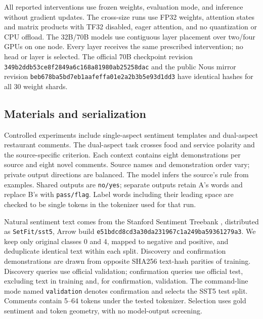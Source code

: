 \documentclass[11pt]{article}
\begin{document}
All reported interventions use frozen weights, evaluation mode, and inference without gradient updates. The cross-size runs use FP32 weights, attention states and matrix products with TF32 disabled, eager attention, and no quantization or CPU offload. The 32B/70B models use contiguous layer placement over two/four GPUs on one node. Every layer receives the same prescribed intervention; no head or layer is selected. The official 70B checkpoint revision \texttt{349b2ddb\allowbreak{}53ce8f28\allowbreak{}49a6c168\allowbreak{}a81980ab\allowbreak{}25258dac} and the public Nous mirror revision \texttt{beb678ba\allowbreak{}5bd7eb1a\allowbreak{}afeffa01\allowbreak{}e2a2b3b5\allowbreak{}e93d1dd3} have identical hashes for all 30 weight shards.

\subsection{Materials and serialization}\label{materials-and-serialization}

Controlled experiments include single-aspect sentiment templates and dual-aspect restaurant comments. The dual-aspect task crosses food and service polarity and the source-specific criterion. Each context contains eight demonstrations per source and eight novel comments. Source names and demonstration order vary; private output directions are balanced. The model infers the source's rule from examples. Shared outputs are \texttt{no/\allowbreak{}yes}; separate outputs retain A's words and replace B's with \texttt{pass/\allowbreak{}flag}. Label words including their leading space are checked to be single tokens in the tokenizer used for that run.

Natural sentiment text comes from the Stanford Sentiment Treebank \citep{socher-etal-2013-recursive}, distributed as \texttt{SetFit/\allowbreak{}sst5}, Arrow build \texttt{e51bdcd8\allowbreak{}cd3a30da\allowbreak{}231967c1\allowbreak{}a249ba59\allowbreak{}361279a3}. We keep only original classes 0 and 4, mapped to negative and positive, and deduplicate identical text within each split. Discovery and confirmation demonstrations are drawn from opposite SHA256 text-hash parities of training. Discovery queries use official validation; confirmation queries use official test, excluding text in training and, for confirmation, validation. The command-line mode named \texttt{validation} denotes confirmation and selects the SST5 test split. Comments contain 5--64 tokens under the tested tokenizer. Selection uses gold sentiment and token geometry, with no model-output screening.
\end{document}
